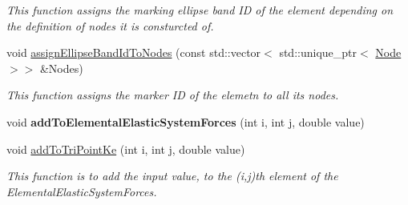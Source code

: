 \begin{DoxyCompactItemize}
\begin{DoxyCompactList}\small\item\em This function assigns the marking ellipse band I\+D of the element depending on the definition of nodes it is consturcted of. \end{DoxyCompactList}\item 
\hypertarget{classShapeBase_aa88977dbe166e6694ad6698b93abfa22}{}void \hyperlink{classShapeBase_aa88977dbe166e6694ad6698b93abfa22}{assign\+Ellipse\+Band\+Id\+To\+Nodes} (const std\+::vector$<$ std\+::unique\+\_\+ptr$<$ \hyperlink{classNode}{Node} $>$$>$ \&Nodes)\label{classShapeBase_aa88977dbe166e6694ad6698b93abfa22}

\begin{DoxyCompactList}\small\item\em This function assigns the marker I\+D of the elemetn to all its nodes. \end{DoxyCompactList}\item 
\hypertarget{classShapeBase_a677fceb50ab5626dbc9c4f8079829d59}{}void {\bfseries add\+To\+Elemental\+Elastic\+System\+Forces} (int i, int j, double value)\label{classShapeBase_a677fceb50ab5626dbc9c4f8079829d59}

\item 
void \hyperlink{classShapeBase_a2e8e11261fb35bc925259151218eebf3}{add\+To\+Tri\+Point\+Ke} (int i, int j, double value)
\begin{DoxyCompactList}\small\item\em This function is to add the input value, to the (i,j)th element of the Elemental\+Elastic\+System\+Forces. \end{DoxyCompactList}\end{DoxyCompactItemize}

